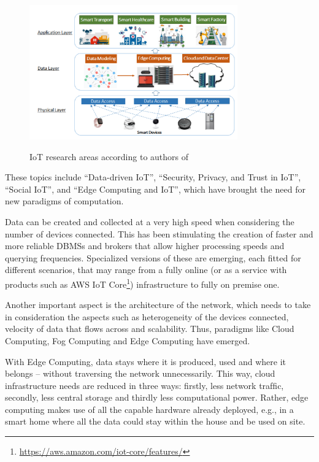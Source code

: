 		\begin{figure}[H]
			\centering
			\includegraphics[width=0.8\textwidth]{resources/img/iot_research_areas}\\
			\caption{IoT research areas according to authors of \cite{9319033}}
			\label{iot_research_areas}
		\end{figure}
	
		These topics include ``Data-driven IoT'', ``Security, Privacy, and Trust in IoT'', ``Social IoT'', and ``Edge Computing and IoT'', which have brought the need for new paradigms of computation.
		
		Data can be created and collected at a very high speed when considering the number of devices connected.
		This has been stimulating the creation of faster and more reliable DBMSs and brokers that allow higher processing speeds and querying frequencies.
		Specialized versions of these are emerging, each fitted for different scenarios, that may range from a fully online (or as a service with products such as AWS IoT Core\footnote{\url{https://aws.amazon.com/iot-core/features/}}) infrastructure to fully on premise one.
		
		Another important aspect is the architecture of the network, which needs to take in consideration the aspects such as heterogeneity of the devices connected, velocity of data that flows across and scalability.
		Thus, paradigms like Cloud Computing, Fog Computing and Edge Computing have emerged.
		
		With Edge Computing, data stays where it is produced,
		used and where it belongs – without traversing the network
		unnecessarily.
		This way, cloud infrastructure needs are reduced
		in three ways: ﬁrstly, less network trafﬁc, secondly, less central
		storage and thirdly less computational power. Rather, edge
		computing makes use of all the capable hardware already
		deployed, e.g., in a smart home where all the data could
		stay within the house and be used on site.
		\cite{loractp}
		
